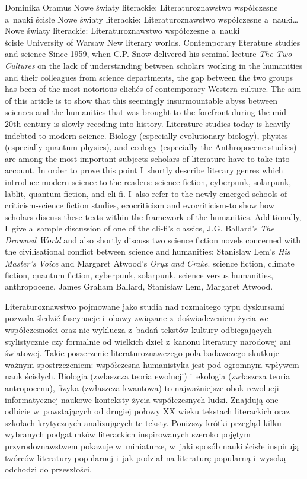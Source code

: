 \begin{artplenv}{Dominika Oramus}
	{Nowe światy literackie: Literaturoznawstwo współczesne a~nauki ścisłe}
	{Nowe światy literackie: Literaturoznawstwo współczesne a~nauki\ldots}
	{Nowe światy literackie: Literaturoznawstwo współczesne a~nauki\\ścisłe}
	{University of Warsaw}
	{New literary worlds. Contemporary literature studies and science}
	{Since 1959, when C.P. Snow delivered his seminal lecture \textit{The Two Cultures} on the lack of understanding between scholars working in the humanities and their colleagues from science departments, the gap between the two groups has been of the most notorious clichés of contemporary Western culture. The aim of this article is to show that this seemingly insurmountable abyss between sciences and the humanities that was brought to the forefront during the mid-20th century is slowly receding into history. Literature studies today is heavily indebted to modern science. Biology (especially evolutionary biology), physics (especially quantum physics), and ecology (especially the Anthropocene studies) are among the most important subjects scholars of literature have to take into account. In order to prove this point I~shortly describe literary genres which introduce modern science to the readers: science fiction, cyberpunk, solarpunk, lablit, quantum fiction, and cli-fi. I~also refer to the newly-emerged schools of criticism-science fiction studies, ecocriticism and evocriticism-to show how scholars discuss these texts within the framework of the humanities. Additionally, I~give a~sample discussion of one of the cli-fi's classics, J.G. Ballard’s \textit{The Drowned World} and also shortly discuss two science fiction novels concerned with the civilisational conflict between science and humanities: Stanislaw Lem's \textit{His Master's Voice} and Margaret Atwood's \textit{Oryx and Crake}.}
	{science fiction, climate fiction, quantum fiction, cyberpunk, solarpunk, science versus humanities, anthropocene, James Graham Ballard, Stanisław Lem, Margaret Atwood.}




\lettrine[loversize=0.13,lines=2,lraise=-0.01,nindent=0em,findent=0.2pt]%
{L}{}iteraturoznawstwo pojmowane jako studia nad rozmaitego typu dyskursami pozwala śledzić fascynacje i~obawy związane z~doświadczeniem życia we współczesności oraz nie wyklucza z~badań tekstów kultury odbiegających stylistycznie czy formalnie od wielkich dzieł z~kanonu literatury narodowej ani światowej. Takie poszerzenie literaturoznawczego pola badawczego skutkuje ważnym spostrzeżeniem: współczesna humanistyka jest pod ogromnym wpływem nauk ścisłych. Biologia (zwłaszcza teoria ewolucji) i~ekologia (zwłaszcza teoria antropocenu), fizyka (zwłaszcza kwantowa) to najważniejsze obok rewolucji informatycznej naukowe konteksty życia współczesnych ludzi. Znajdują one odbicie w~powstających od drugiej połowy XX wieku tekstach literackich oraz szkołach krytycznych analizujących te teksty. Poniższy krótki przegląd kilku wybranych podgatunków literackich inspirowanych szeroko pojętym przyrodoznawstwem pokazuje w~miniaturze, w~jaki sposób nauki ścisłe inspirują twórców literatury popularnej i~jak podział na literaturę popularną i~wysoką odchodzi do przeszłości.


\end{artplenv}
